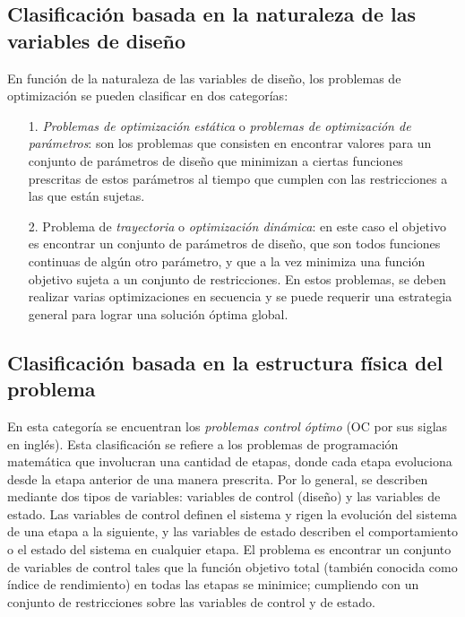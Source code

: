 \subsection{Clasificación basada en la naturaleza de las variables de diseño} 
En función de la naturaleza de las variables de diseño, los problemas de optimización se pueden clasificar en dos categorías:
\begin{itemize}
\item[1.]  \textit{Problemas de optimización estática} o \textit{problemas de optimización de parámetros}: son los problemas que consisten en encontrar valores para un conjunto de parámetros de diseño que minimizan a ciertas funciones prescritas de estos parámetros al tiempo que cumplen con las restricciones a las que están sujetas. 
\item[2.] Problema de \textit{trayectoria} o \textit{optimización dinámica}: en este caso el objetivo es encontrar un conjunto de parámetros de diseño, que son todos funciones continuas de algún otro parámetro, y que a la vez minimiza una función objetivo sujeta a un conjunto de restricciones. En estos problemas, se deben realizar varias optimizaciones en secuencia y se puede requerir una estrategia general para lograr una solución óptima global.
\end{itemize}
 \subsection{Clasificación basada en la estructura física del problema} 
En esta categoría se encuentran los \textit{problemas control óptimo } (OC por sus siglas en inglés). Esta clasificación se refiere a los problemas de programación matemática que involucran una cantidad de etapas, donde cada etapa evoluciona desde la etapa anterior de una manera prescrita. Por lo general, se describen mediante dos tipos de variables: variables de control (diseño) y las variables de estado. Las variables de control definen el sistema y rigen la evolución del sistema de una etapa a la siguiente, y las variables de estado describen el comportamiento o el estado del sistema en cualquier etapa. El problema es encontrar un conjunto de variables de control tales que la función objetivo total (también conocida como índice de rendimiento) en todas las etapas se minimice; cumpliendo con un conjunto de restricciones sobre las variables de control y de estado.

